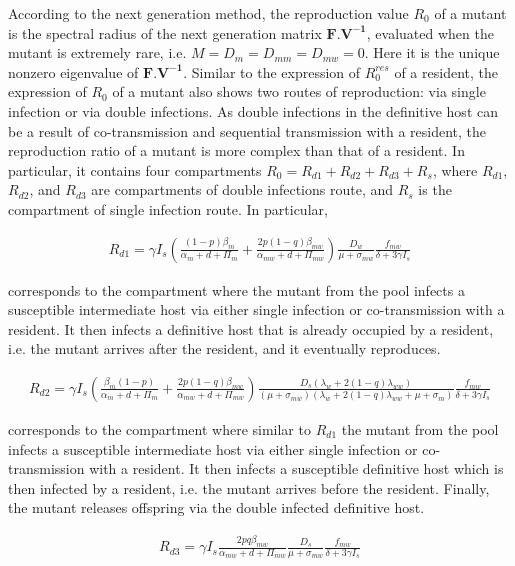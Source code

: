\documentclass{article}
\begin{document}
According to the next generation method, the reproduction value $R_0$ of a mutant is the spectral radius of the next generation matrix $\mathbf{F.V^{-1}}$, evaluated when the mutant is extremely rare, i.e. $M = D_{m} = D_{mm} = D_{mw} = 0$. Here it is the unique nonzero eigenvalue of $\mathbf{F.V^{-1}}$. Similar to the expression of $R^{res}_0$ of a resident, the expression of $R_0$ of a mutant also shows two routes of reproduction: via single infection or via double infections. As double infections in the definitive host can be a result of co-transmission and sequential transmission with a resident, the reproduction ratio of a mutant is more complex than that of a resident. In particular, it contains four compartments $R_0 = R_{d1} + R_{d2} + R_{d3} + R_s$, where $R_{d1}$, $R_{d2}$, and $R_{d3}$ are compartments of double infections route, and $R_s$ is the compartment of single infection route. In particular,

\begin{align*}
R_{d1} = \gamma  I_s \left( \frac{(1-p) \beta_m}{\alpha_m + d + \Pi_m} + \frac{2 p (1-q) \beta_{mw}}{\alpha_{mw} + d + \Pi_{mw}} \right)\frac{D_w}{\mu + \sigma_{mw}} \frac{f_{mw}}{\delta +3 \gamma  I_s}
\end{align*}
 
corresponds to the compartment where the mutant from the pool infects a susceptible intermediate host via either single infection or co-transmission with a resident. It then infects a definitive host that is already occupied by a resident, i.e. the mutant arrives after the resident, and it eventually reproduces.

\begin{align*}
R_{d2} = \gamma  I_s \left(\frac{\beta_m (1-p)}{\alpha_m + d + \Pi_m} + \frac{2 p (1-q) \beta_{mw}}{\alpha_{mw} + d + \Pi_{mw}}\right) \frac{D_s (\lambda_w + 2  (1-q) \lambda_{ww})}{(\mu + \sigma_{mw}) (\lambda_w  + 2 (1-q) \lambda_{ww} + \mu + \sigma_m)} \frac{f_{mw}}{\delta +3 \gamma  I_s}
\end{align*}

corresponds to the compartment where similar to $R_{d1}$ the mutant from the pool infects a susceptible intermediate host via either single infection or co-transmission with a resident. It then infects a susceptible definitive host which is then infected by a resident, i.e. the mutant arrives before the resident. Finally, the mutant releases offspring via the double infected definitive host.

\begin{align*}
R_{d3} = \gamma  I_s \frac{2 p q \beta_{mw}}{\alpha_{mw} + d + \Pi_{mw}} \frac{D_s}{\mu + \sigma_{mw}} \frac{f_{mw}}{\delta +3 \gamma  I_s}
\end{align*}
\end{document}
